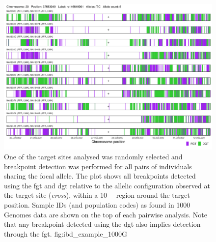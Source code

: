 

\begin{figure}[!htbp]
\includegraphics[width=\textwidth]{./img/ch3/ibd_example_1000G}
{One of the target sites analysed was randomly selected and breakpoint detection was performed for all pairs of individuals sharing the focal allele.
The plot shows all breakpoints detected using the \gls{fgt} and \gls{dgt} relative to the allelic configuration observed at the target site (\emph{cross}), within a \SI{10}{\mega\basepair} region around the target position.
Sample IDs (and population codes) as found in 1000 Genomes data are shown on the top of each pairwise analysis.
Note that any breakpoint detected using the \gls{dgt} also implies detection through the \gls{fgt}.\AdditionLabel}
{fig:ibd_example_1000G}
\end{figure}
